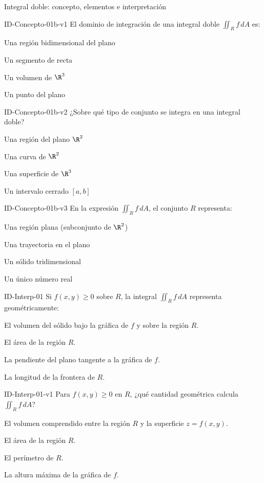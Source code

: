 \documentclass[a4,11pt]{aleph-notas}
\begin{document}
\begin{quiz}{Integral doble: concepto, elementos e interpretación}
\begin{multi}[]%
    {ID-Concepto-01b-v1}
    El dominio de integración de una integral doble $\displaystyle\iint_R f\,dA$ es:
    \item* Una región bidimensional del plano
    \item Un segmento de recta
    \item Un volumen de $\R^3$
    \item Un punto del plano
\end{multi}

\begin{multi}[]%
    {ID-Concepto-01b-v2}
    ¿Sobre qué tipo de conjunto se integra en una integral doble?
    \item* Una región del plano $\R^2$
    \item Una curva de $\R^2$
    \item Una superficie de $\R^3$
    \item Un intervalo cerrado $[a,b]$
\end{multi}

\begin{multi}[]%
    {ID-Concepto-01b-v3}
    En la expresión $\displaystyle\iint_R f\,dA$, el conjunto $R$ representa:
    \item* Una región plana (subconjunto de $\R^2$)
    \item Una trayectoria en el plano
    \item Un sólido tridimensional
    \item Un único número real
\end{multi}

\begin{multi}[]%
    {ID-Interp-01}
    Si $f(x,y)\geq 0$ sobre $R$, la integral $\displaystyle\iint_R f\,dA$ representa geométricamente:
    \item* El volumen del sólido bajo la gráfica de $f$ y sobre la región $R$.
    \item El área de la región $R$.
    \item La pendiente del plano tangente a la gráfica de $f$.
    \item La longitud de la frontera de $R$.
\end{multi}

\begin{multi}[]%
    {ID-Interp-01-v1}
    Para $f(x,y)\geq 0$ en $R$, ¿qué cantidad geométrica calcula $\displaystyle\iint_R f\,dA$?
    \item* El volumen comprendido entre la región $R$ y la superficie $z=f(x,y)$.
    \item El área de la región $R$.
    \item El perímetro de $R$.
    \item La altura máxima de la gráfica de $f$.
\end{multi}


\end{quiz}
\end{document}
